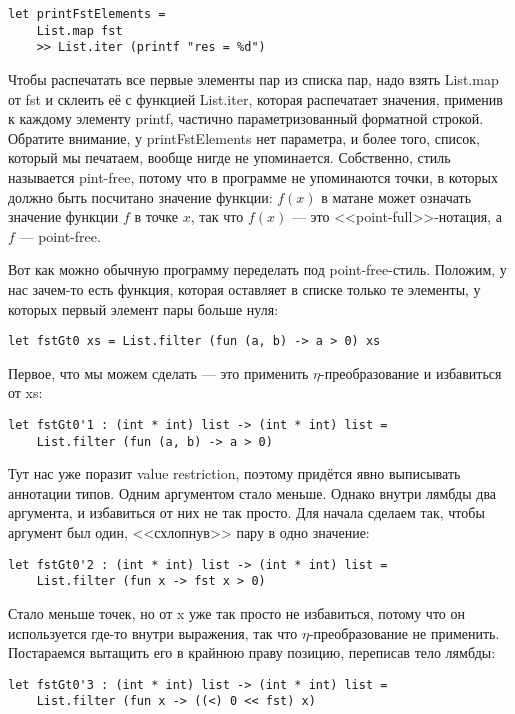 \documentclass[a5paper]{article}
\begin{document}
\begin{verbatim}
let printFstElements = 
    List.map fst
    >> List.iter (printf "res = %d")
\end{verbatim}

Чтобы распечатать все первые элементы пар из списка пар, надо взять List.map от fst и склеить её с функцией List.iter, которая распечатает значения, применив к каждому элементу printf, частично параметризованный форматной строкой. Обратите внимание, у printFstElements нет параметра, и более того, список, который мы печатаем, вообще нигде не упоминается. Собственно, стиль называется pint-free, потому что в программе не упоминаются точки, в которых должно быть посчитано значение функции: $f(x)$ в матане может означать значение функции $f$ в точке $x$, так что $f(x)$ --- это <<point-full>>-нотация, а $f$ --- point-free.

Вот как можно обычную программу переделать под point-free-стиль. Положим, у нас зачем-то есть функция, которая оставляет в списке только те элементы, у которых первый элемент пары больше нуля:

\begin{verbatim}
let fstGt0 xs = List.filter (fun (a, b) -> a > 0) xs
\end{verbatim}

Первое, что мы можем сделать --- это применить $\eta$-преобразование и избавиться от xs:

\begin{verbatim}
let fstGt0'1 : (int * int) list -> (int * int) list = 
    List.filter (fun (a, b) -> a > 0)
\end{verbatim}

Тут нас уже поразит value restriction, поэтому придётся явно выписывать аннотации типов. Одним аргументом стало меньше. Однако внутри лямбды два аргумента, и избавиться от них не так просто. Для начала сделаем так, чтобы аргумент был один, <<схлопнув>> пару в одно значение:

\begin{verbatim}
let fstGt0'2 : (int * int) list -> (int * int) list = 
    List.filter (fun x -> fst x > 0)
\end{verbatim}

Стало меньше точек, но от x уже так просто не избавиться, потому что он используется где-то внутри выражения, так что $\eta$-преобразование не применить. Постараемся вытащить его в крайнюю праву позицию, переписав тело лямбды:

\begin{verbatim}
let fstGt0'3 : (int * int) list -> (int * int) list = 
    List.filter (fun x -> ((<) 0 << fst) x)
\end{verbatim}
\end{document}
